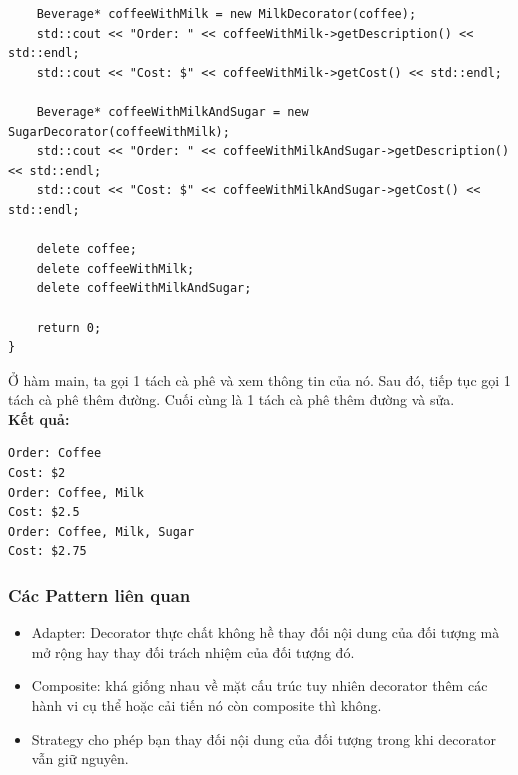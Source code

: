 \begin{lstlisting}
    Beverage* coffeeWithMilk = new MilkDecorator(coffee);
    std::cout << "Order: " << coffeeWithMilk->getDescription() << std::endl;
    std::cout << "Cost: $" << coffeeWithMilk->getCost() << std::endl;

    Beverage* coffeeWithMilkAndSugar = new SugarDecorator(coffeeWithMilk);
    std::cout << "Order: " << coffeeWithMilkAndSugar->getDescription() << std::endl;
    std::cout << "Cost: $" << coffeeWithMilkAndSugar->getCost() << std::endl;

    delete coffee;
    delete coffeeWithMilk;
    delete coffeeWithMilkAndSugar;

    return 0;
}

\end{lstlisting}
Ở hàm main, ta gọi 1 tách cà phê và xem thông tin của nó. Sau đó, tiếp tục gọi 1 tách cà phê thêm đường. Cuối cùng là 1 tách cà phê thêm đường và sửa.\\
\newline
\textbf{Kết quả:}
\begin{lstlisting}
Order: Coffee
Cost: $2
Order: Coffee, Milk
Cost: $2.5
Order: Coffee, Milk, Sugar
Cost: $2.75

\end{lstlisting}
\subsubsection{Các Pattern liên quan}
\begin{itemize}
    \item Adapter: Decorator thực chất không hề thay đối nội dung của đối tượng mà mở rộng hay thay đối trách nhiệm của đối tượng đó.
    \item Composite: khá giống nhau về mặt cấu trúc tuy nhiên decorator thêm các hành vi cụ thể hoặc cải tiến nó còn composite thì không.
    \item Strategy cho phép bạn thay đối nội dung của đối tượng trong khi decorator vẫn giữ nguyên.
\end{itemize}